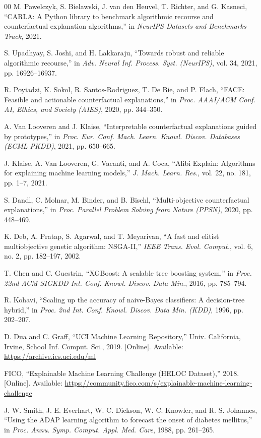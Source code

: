 \documentclass[nolineno]{paper/ieee-access/ieeeaccess}%
\begin{document}
\begin{thebibliography}{00}
M. Pawelczyk, S. Bielawski, J. van den Heuvel, T. Richter, and G. Kasneci,
``{CARLA}: A {Python} library to benchmark algorithmic recourse and counterfactual explanation algorithms,''
in \emph{NeurIPS Datasets and Benchmarks Track}, 2021.

S. Upadhyay, S. Joshi, and H. Lakkaraju,
``Towards robust and reliable algorithmic recourse,''
in \emph{Adv. Neural Inf. Process. Syst. (NeurIPS)}, vol. 34, 2021, pp. 16926--16937.

R. Poyiadzi, K. Sokol, R. Santos-Rodriguez, T. De Bie, and P. Flach,
``{FACE}: Feasible and actionable counterfactual explanations,''
in \emph{Proc. AAAI/ACM Conf. AI, Ethics, and Society (AIES)}, 2020, pp. 344--350.

A. Van Looveren and J. Klaise,
``Interpretable counterfactual explanations guided by prototypes,''
in \emph{Proc. Eur. Conf. Mach. Learn. Knowl. Discov. Databases (ECML PKDD)}, 2021, pp. 650--665.

J. Klaise, A. Van Looveren, G. Vacanti, and A. Coca,
``Alibi Explain: Algorithms for explaining machine learning models,''
\emph{J. Mach. Learn. Res.}, vol. 22, no. 181, pp. 1--7, 2021.

S. Dandl, C. Molnar, M. Binder, and B. Bischl,
``Multi-objective counterfactual explanations,''
in \emph{Proc. Parallel Problem Solving from Nature (PPSN)}, 2020, pp. 448--469.

K. Deb, A. Pratap, S. Agarwal, and T. Meyarivan,
``A fast and elitist multiobjective genetic algorithm: {NSGA-II},''
\emph{IEEE Trans. Evol. Comput.}, vol. 6, no. 2, pp. 182--197, 2002.

T. Chen and C. Guestrin,
``{XGBoost}: A scalable tree boosting system,''
in \emph{Proc. 22nd ACM SIGKDD Int. Conf. Knowl. Discov. Data Min.}, 2016, pp. 785--794.

R. Kohavi,
``Scaling up the accuracy of naive-{B}ayes classifiers: A decision-tree hybrid,''
in \emph{Proc. 2nd Int. Conf. Knowl. Discov. Data Min. (KDD)}, 1996, pp. 202--207.

D. Dua and C. Graff,
``{UCI} Machine Learning Repository,''
Univ. California, Irvine, School Inf. Comput. Sci., 2019. [Online]. Available: \url{https://archive.ics.uci.edu/ml}

{FICO},
``Explainable Machine Learning Challenge ({HELOC} Dataset),''
2018. [Online]. Available: \url{https://community.fico.com/s/explainable-machine-learning-challenge}

J. W. Smith, J. E. Everhart, W. C. Dickson, W. C. Knowler, and R. S. Johannes,
``Using the {ADAP} learning algorithm to forecast the onset of diabetes mellitus,''
in \emph{Proc. Annu. Symp. Comput. Appl. Med. Care}, 1988, pp. 261--265.
\end{thebibliography}
\end{document}
